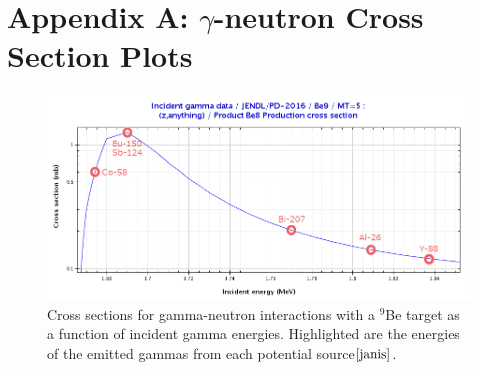 \documentclass[%
12pt,
twoside,
reprint,
amsmath,amssymb,
aps,
]{article}
\begin{document}
%
%

	\section*{Appendix A: $\gamma$-neutron Cross Section Plots}
	
	\begin{figure}[H]
		\includegraphics[scale = 2.5, center]{Images/be_plot.png}
		\caption{\label{tab:table-name} Cross sections for gamma-neutron interactions with a $^{9}$Be target as a function of incident gamma energies. Highlighted are the energies of the emitted gammas from each potential source${\cite{janis}}$.}
	\end{figure}
\end{document}
